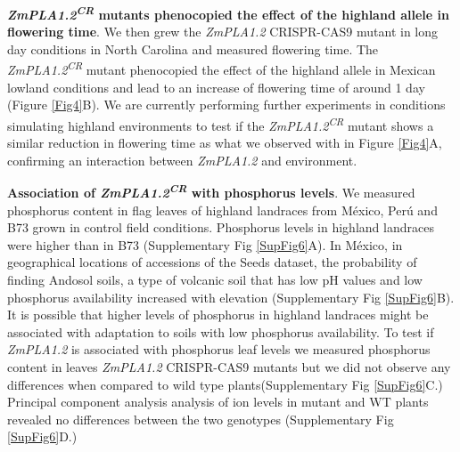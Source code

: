 \documentclass[9pt,twocolumn,twoside,lineno]{BioRxiv}
\begin{document}
\textbf{\textit{ZmPLA1.2\textsuperscript{CR}} mutants phenocopied the effect of the highland allele in flowering time}.
We then grew the \textit{ZmPLA1.2} CRISPR-CAS9 mutant in long day conditions in North Carolina and measured flowering time. 
The \textit{ZmPLA1.2\textsuperscript{CR}} mutant phenocopied the effect of the highland allele in Mexican lowland conditions and lead to an increase of flowering time of around 1 day (Figure \ref{Fig4}B). 
We are currently performing further experiments in conditions simulating highland environments to test if the \textit{ZmPLA1.2\textsuperscript{CR}} mutant shows a similar reduction in flowering time as what we observed with in Figure \ref{Fig4}A, confirming an interaction between \textit{ZmPLA1.2} and environment.


\textbf{Association of \textit{ZmPLA1.2\textsuperscript{CR}} with phosphorus levels}.
We measured phosphorus content in flag leaves of highland landraces from México, Perú and B73 grown in control field conditions. 
Phosphorus levels in highland landraces were higher than in B73 (Supplementary Fig \ref{SupFig6}A). 
In México, in geographical locations of accessions of the Seeds dataset, the probability of finding Andosol soils, a type of volcanic soil that has low pH values and low phosphorus availability increased with elevation (Supplementary Fig \ref{SupFig6}B).
It is possible that higher levels of phosphorus in highland landraces might be associated with adaptation to soils with low phosphorus availability. 
To test if \textit{ZmPLA1.2} is associated with phosphorus leaf levels we measured phosphorus content in leaves \textit{ZmPLA1.2} CRISPR-CAS9 mutants but we did not observe any differences when compared to wild type plants(Supplementary Fig \ref{SupFig6}C.) 
Principal component analysis analysis of ion levels in mutant and WT plants revealed no differences between the two genotypes (Supplementary Fig \ref{SupFig6}D.)
\end{document}
